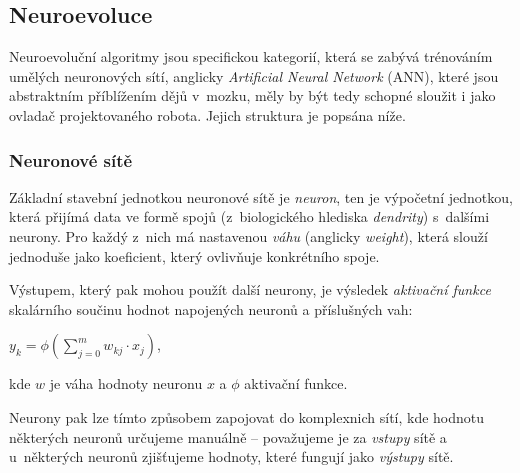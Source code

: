 \documentclass[a4]{article}
\begin{document}
\subsection{Neuroevoluce}
Neuroevoluční algoritmy jsou specifickou kategorií, která se zabývá trénováním umělých neuronových sítí, anglicky \emph{Artificial Neural Network} (ANN), které jsou abstraktním příblížením dějů v~mozku, měly by být tedy schopné sloužit i jako ovladač projektovaného robota. Jejich struktura je popsána níže.
\subsubsection{Neuronové sítě}
Základní stavební jednotkou neuronové sítě je \emph{neuron}, ten je výpočetní jednotkou, která přijímá data ve formě spojů (z~biologického hlediska \emph{dendrity}) s~dalšími neurony. Pro každý z~nich má nastavenou \emph{váhu} (anglicky \emph{weight}), která slouží jednoduše jako koeficient, který ovlivňuje  konkrétního spoje.\par
Výstupem, který pak mohou použít další neurony, je výsledek \emph{aktivační funkce} skalárního součinu hodnot napojených neuronů a příslušných vah\cite{neuron}:
\begin{center}$y_k=\phi(\sum_{j=0}^m w_{kj}\cdot x_j)$,\end{center}
kde $w$ je váha hodnoty neuronu $x$ a $\phi$ aktivační funkce.\par
Neurony pak lze tímto způsobem zapojovat do komplexnich sítí, kde hodnotu některých neuronů určujeme manuálně -- považujeme je za \emph{vstupy} sítě a u~některých neuronů zjišťujeme hodnoty, které fungují jako \emph{výstupy} sítě.
\end{document}
